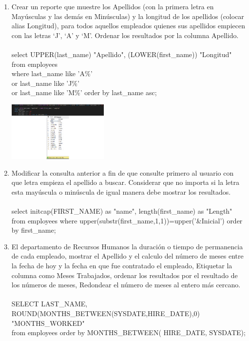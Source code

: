 \begin{enumerate}[1.]
	\item Crear un reporte que muestre los Apellidos (con la primera letra en May\'usculas y las demás en Min\'usculas) y la longitud de los apellidos (colocar alias Longitud), para todos aquellos empleados quienes sus apellidos empiecen con las letras ‘J’, ‘A’ y ‘M’. Ordenar los resultados por la columna Apellido.
	\\
	\\select UPPER(last\_name) "Apellido", (LOWER(first\_name)) "Longitud" 
	\\from employees 
	\\where last\_name like 'A\%'
     	\\ or last\_name like 'J\%'
      	\\or last\_name like 'M\%' order by last\_name asc;
      	\begin{center}
	\includegraphics[width=5cm]{./Imagenes/actividad_05_04}
	\end{center}

	\item Modificar la consulta anterior a fin de que consulte primero al usuario con que letra empieza el apellido a buscar. Considerar que no importa si la letra esta may\'uscula o min\'uscula de igual manera debe mostrar los resultados.
	\\
	\\select initcap(FIRST\_NAME) as "name", length(first\_name) as "Length" from employees where upper(substr(first\_name,1,1))=upper('\&Inicial') order by first\_name;

	\item El departamento de Recursos Humanos la duración o tiempo de permanencia de cada empleado, mostrar el Apellido y el calculo del número de meses entre la fecha de hoy y la fecha en que fue contratado el empleado, Etiquetar la columna como Meses Trabajados, ordenar los resultados por el resultado de los n\'umeros de meses, Redondear el número de meses al entero más cercano.
	\\
	\\SELECT LAST\_NAME, ROUND(MONTHS\_BETWEEN(SYSDATE,HIRE\_DATE),0) "MONTHS\_WORKED"
	\\from employees order by MONTHS\_BETWEEN( HIRE\_DATE, SYSDATE);


\end{enumerate}

